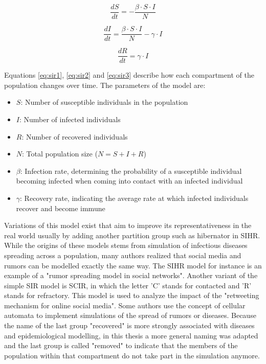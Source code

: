 \begin{equation} \label{eq:sir1}
    \frac{{dS}}{{dt}} = -\frac{{\beta \cdot S \cdot I}}{{N}}
\end{equation}

\begin{equation} \label{eq:sir2}
    \frac{{dI}}{{dt}} = \frac{{\beta \cdot S \cdot I}}{{N}} - \gamma \cdot I
\end{equation}

\begin{equation} \label{eq:sir3}
    \frac{{dR}}{{dt}} = \gamma \cdot I
\end{equation}

Equations \ref{eq:sir1}, \ref{eq:sir2} and \ref{eq:sir3} describe how each compartment of the population changes over time.
The parameters of the model are:

\begin{itemize}
    \item $S$: Number of susceptible individuals in the population
    \item $I$: Number of infected individuals
    \item $R$: Number of recovered individuals
    \item $N$: Total population size ($N = S + I + R$)
    \item $\beta$: Infection rate, determining the probability of a susceptible individual becoming infected when coming into contact with an infected individual
    \item $\gamma$: Recovery rate, indicating the average rate at which infected individuals recover and become immune
\end{itemize}

Variations of this model exist that aim to improve its representativeness in the real world usually by adding another partition group such as hibernator in SIHR\cite{zhao2012sihr}.
While the origins of these models stems from simulation of infectious diseases spreading across a population, many authors realized that social media and rumors can be modelled exactly the same way.
The SIHR model for instance is an example of a "rumor spreading model in social networks"\cite{zhao2012sihr}.
Another variant of the simple SIR model is SCIR, in which the letter 'C' stands for contacted and 'R' stands for refractory.
This model is used to analyze the impact of the "retweeting mechanism for online social media"\cite{xiong2012scir}.
Some authors use the concept of cellular automata to implement simulations of the spread of rumors or diseases\cite{silva2020}.
Because the name of the last group "recovered" is more strongly associated with diseases and epidemiological modelling, in this thesis a more general naming was adapted and the last group is called "removed" to indicate that the members of the population within that compartment do not take part in the simulation anymore.

